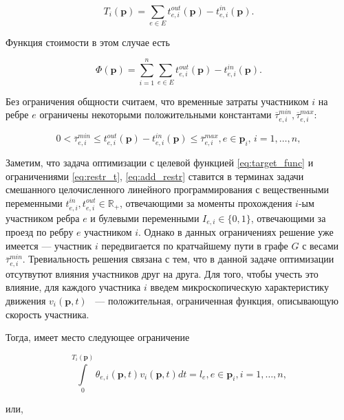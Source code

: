 \documentclass[12pt, a4paper]{article}
\begin{document}
\begin{equation}
	\label{eq:T_i_by_t}
	T_i(\textbf{p}) = \sum \limits_{e \in E} t_{e, i}^{out}(\textbf{p}) - t_{e, i}^{in}(\textbf{p}).
\end{equation}

Функция стоимости в этом случае есть 

\begin{equation}
	\label{eq:target_func}
	\Phi(\textbf{p}) =\sum \limits_{i = 1}^n \sum \limits_{e \in E} t_{e, i}^{out}(\textbf{p}) - t_{e, i}^{in}(\textbf{p}).
\end{equation}

Без ограничения общности считаем, что временные затраты участником $i$ на ребре $e$ ограничены некоторыми положительными константами $\overline{\tau}_{e, i}^{min}, \overline{\tau}_{e, i}^{max}$:

\begin{equation}
	\label{eq:add_restr}
		0 < \overline{\tau}_{e, i}^{min} \le t_{e, i}^{out}(\textbf{p}) - t_{e, i}^{in}(\textbf{p}) \le \overline{\tau}_{e, i}^{max}, e \in \textbf{p}_i,\, i = 1, \dots, n,
\end{equation}

Заметим, что задача оптимизации с целевой функцией \eqref{eq:target_func} и ограничениями \eqref{eq:restr_t}, \eqref{eq:add_restr} ставится в терминах задачи смешанного целочисленного линейного программирования с вещественными переменными $t_{e, i}^{in}, t_{e, i}^{out} \in \mathbb{R}_+$, отвечающими за моменты прохождения $i$-ым участником ребра $e$ и булевыми переменными $I_{e, i} \in \{0, 1\}$, отвечающими за проезд по ребру $e$ участником $i$. Однако в данных ограничениях решение уже имеется --- участник $i$ передвигается по кратчайшему пути в графе $G$ с весами $\overline{\tau}_{e, i}^{min}$. Тревиальность решения связана с тем, что в данной задаче оптимизации отсутвутют влияния участников друг на друга. Для того, чтобы учесть это влияние, для каждого участника $i$ введем микроскопическую характеристику движения $v_i(\textbf{p}, t)$ ~--- положительная, ограниченная функция, описывающую скорость участника.


Тогда, имеет место следующее ограничение

\begin{equation}
	\label{eq:velocity_eq_by_theta}
	\int\limits_{0}^{T_i(\textbf{p})} \theta_{e, i} (\textbf{p}, t) v_i(\textbf{p}, t) dt = l_e, e \in \textbf{p}_i, i = 1, \dots, n,
\end{equation}

или,
\end{document}
